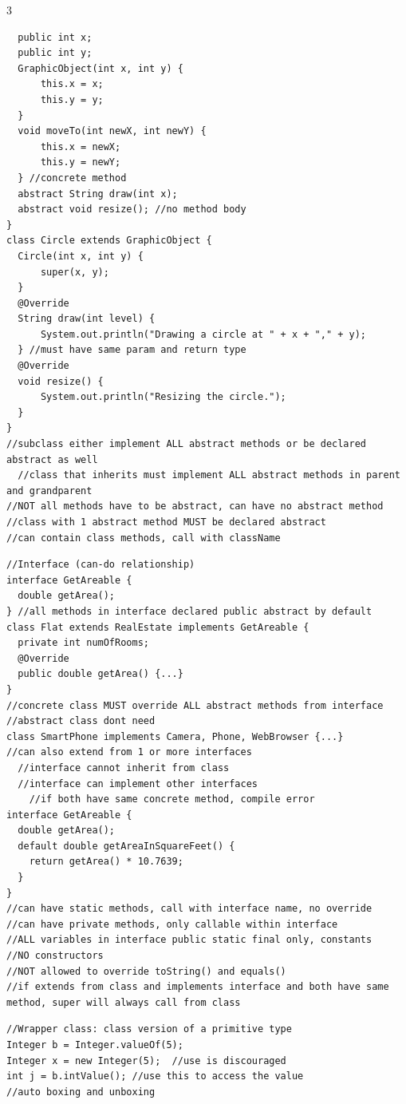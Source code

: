 \documentclass[10pt]{article}
\begin{document}
\begin{multicols*}{3}
\begin{verbatim}
  public int x;
  public int y;
  GraphicObject(int x, int y) {
      this.x = x;
      this.y = y;
  }
  void moveTo(int newX, int newY) {
      this.x = newX;
      this.y = newY;
  } //concrete method
  abstract String draw(int x);
  abstract void resize(); //no method body
}
class Circle extends GraphicObject {
  Circle(int x, int y) {
      super(x, y);
  }
  @Override
  String draw(int level) {
      System.out.println("Drawing a circle at " + x + "," + y);
  } //must have same param and return type
  @Override
  void resize() {
      System.out.println("Resizing the circle.");
  }
}
//subclass either implement ALL abstract methods or be declared abstract as well
  //class that inherits must implement ALL abstract methods in parent and grandparent
//NOT all methods have to be abstract, can have no abstract method
//class with 1 abstract method MUST be declared abstract
//can contain class methods, call with className
\end{verbatim}
\begin{verbatim}
//Interface (can-do relationship)
interface GetAreable {
  double getArea();
} //all methods in interface declared public abstract by default
class Flat extends RealEstate implements GetAreable {
  private int numOfRooms;
  @Override
  public double getArea() {...}
}
//concrete class MUST override ALL abstract methods from interface
//abstract class dont need
class SmartPhone implements Camera, Phone, WebBrowser {...}
//can also extend from 1 or more interfaces
  //interface cannot inherit from class
  //interface can implement other interfaces
    //if both have same concrete method, compile error
interface GetAreable {
  double getArea();
  default double getAreaInSquareFeet() {
    return getArea() * 10.7639;
  }
}
//can have static methods, call with interface name, no override
//can have private methods, only callable within interface
//ALL variables in interface public static final only, constants
//NO constructors
//NOT allowed to override toString() and equals()
//if extends from class and implements interface and both have same method, super will always call from class
\end{verbatim}
\begin{verbatim}
//Wrapper class: class version of a primitive type
Integer b = Integer.valueOf(5);
Integer x = new Integer(5);  //use is discouraged
int j = b.intValue(); //use this to access the value
//auto boxing and unboxing

\end{verbatim}
\end{multicols*}
\end{document}
